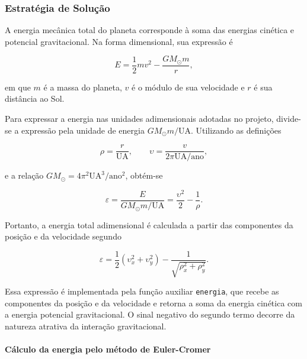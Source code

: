 \documentclass[12pt,a4paper]{article}
\begin{document}
\subsubsection{Estratégia de Solução}

A energia mecânica total do planeta corresponde à soma das energias cinética e potencial gravitacional. Na forma dimensional, sua expressão é

\begin{equation}
    E=\frac{1}{2}m v^2-\frac{GM_{\odot}m}{r},
\end{equation}

em que $m$ é a massa do planeta, $v$ é o módulo de sua velocidade e $r$ é sua distância ao Sol.

Para expressar a energia nas unidades adimensionais adotadas no projeto, divide-se a expressão pela unidade de energia $GM_{\odot}m/\mathrm{UA}$. Utilizando as definições

\begin{equation}
    \rho=\frac{r}{\mathrm{UA}},
    \qquad
    \upsilon=\frac{v}{2\pi\mathrm{UA}/\mathrm{ano}},
\end{equation}

e a relação $GM_{\odot}=4\pi^2\mathrm{UA}^3/\mathrm{ano}^2$, obtém-se

\begin{equation}
    \varepsilon=\frac{E}{GM_{\odot}m/\mathrm{UA}}
    =\frac{\upsilon^2}{2}-\frac{1}{\rho}.
\end{equation}

Portanto, a energia total adimensional é calculada a partir das componentes da posição e da velocidade segundo

\begin{equation}
    \boxed{
    \varepsilon=
    \frac{1}{2}\left(\upsilon_x^2+\upsilon_y^2\right)
    -\frac{1}{\sqrt{\rho_x^2+\rho_y^2}}
    }.
\end{equation}

Essa expressão é implementada pela função auxiliar \texttt{energia}, que recebe as componentes da posição e da velocidade e retorna a soma da energia cinética com a energia potencial gravitacional. O sinal negativo do segundo termo decorre da natureza atrativa da interação gravitacional.

\paragraph{Cálculo da energia pelo método de Euler-Cromer}
\end{document}
